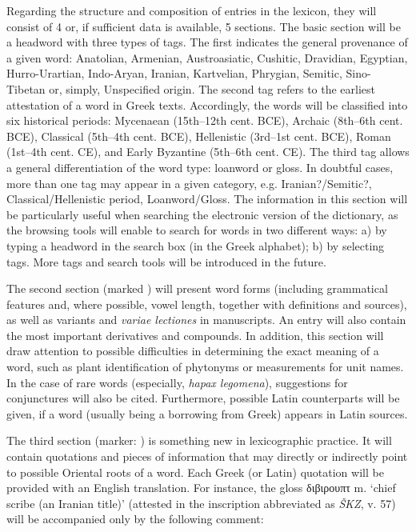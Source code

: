 \documentclass[output=paper,colorlinks,citecolor=brown,arabicfont,chinesefont]{langscibook}
\begin{document}
Regarding the structure and composition of entries in the lexicon, they will consist of 4 or, if sufficient data is available, 5 sections. The basic section will be a headword with three types of tags. The first indicates the general provenance of a given word: Anatolian, Armenian, Austroasiatic, Cushitic, Dravidian, Egyptian, Hurro-Urartian, Indo-Aryan, Iranian, Kartvelian, Phrygian, Semitic, Sino-Tibetan or, simply, Unspecified origin. The second tag refers to the earliest attestation of a word in Greek texts. Accordingly, the words will be classified into six historical periods: Mycenaean (15th–12th cent. BCE), Archaic (8th–6th cent. BCE), Classical (5th–4th cent. BCE), Hellenistic (3rd–1st cent. BCE), Roman (1st–4th cent. CE), and Early Byzantine (5th–6th cent. CE). The third tag allows a general differentiation of the word type: loanword or gloss. In doubtful cases, more than one tag may appear in a given category, e.g. Iranian?/Semitic?, Classical/Hellenistic period, Loanword/Gloss. The information in this section will be particularly useful when searching the electronic version of the dictionary, as the browsing tools will enable to search for words in two different ways: a) by typing a headword in the search box (in the Greek alphabet); b) by selecting tags. More tags and search tools will be introduced in the future.

The second section (marked ) will present word forms (including grammatical features and, where possible, vowel length, together with definitions and sources), as well as variants and \emph{variae lectiones} in manuscripts. An entry will also contain the most important derivatives and compounds. In addition, this section will draw attention to possible difficulties in determining the exact meaning of a word, such as plant identification of phytonyms or measurements for unit names. In the case of rare words (especially, \emph{hapax legomena}), suggestions for conjunctures will also be cited. Furthermore, possible Latin counterparts will be given, if a word (usually being a borrowing from Greek) appears in Latin sources.

The third section (marker: ) is something new in lexicographic practice. It will contain quotations and pieces of information that may directly or indirectly point to possible Oriental roots of a word. Each Greek (or Latin) quotation will be provided with an English translation. For instance, the gloss διβιρουπτ m. ‘chief scribe (an Iranian title)’ (attested in the inscription abbreviated as \emph{ŠKZ}, v. 57) will be accompanied only by the following comment: 
\end{document}
